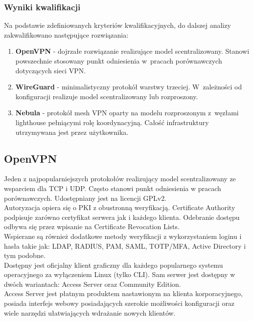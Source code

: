 \newpage

\subsubsection{Wyniki kwalifikacji}

Na podstawie zdefiniowanych kryteriów kwalifikacyjnych, do dalszej analizy zakwalifikowano następujące rozwiązania:

\begin{enumerate}[leftmargin=*]
    \item \textbf{OpenVPN} - dojrzałe rozwiązanie realizujące model scentralizowany. Stanowi powszechnie stosowany punkt odniesienia w~pracach porównawczych dotyczących sieci VPN.
    \item \textbf{WireGuard} - minimalistyczny protokół warstwy trzeciej. W~zależności od konfiguracji realizuje model scentralizowany lub rozproszony.
    \item \textbf{Nebula} - protokół mesh VPN oparty na modelu rozproszonym z~węzłami lighthouse pełniącymi rolę koordynacyjną. Całość infrastruktury utrzymywana jest przez użytkownika.
\end{enumerate}

\newpage
\subsection{OpenVPN}

Jeden z najpopularniejszych protokołów realizujący model scentralizowany ze wsparciem dla TCP i UDP. Często stanowi punkt odniesienia w pracach porównawczych. Udostępniany jest na licencji GPLv2.\\

Autoryzacja opiera się o PKI z obustronną weryfikacją. Certificate Authority podpisuje zarówno certyfikat serwera jak i każdego klienta. Odebranie dostępu odbywa się przez wpisanie na Certificate Revocation Lists.\\

Wspierane są również dodatkowe metody weryfikacji z wykorzystaniem loginu i hasła takie jak: LDAP, RADIUS, PAM, SAML, TOTP/MFA, Active Directory i tym podobne.\\

Dostępny jest oficjalny klient graficzny dla każdego popularnego systemu operacyjnego za wyłączeniem Linux (tylko CLI). Sam serwer jest dostępny w dwóch wariantach: Access Server oraz Community Edition.\\

Access Server jest płatnym produktem nastawionym na klienta korporacyjnego, posiada interfejs webowy posiadających szerokie możliwości konfiguracji oraz wiele narzędzi ułatwiających wdrażanie nowych klientów.\\

